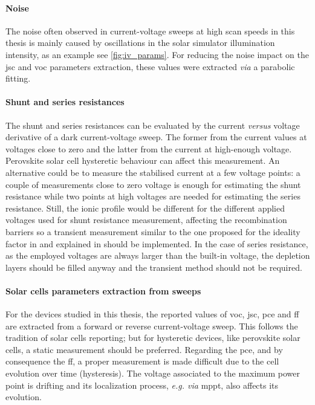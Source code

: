 	\paragraph{Noise}
	The noise often observed in current-voltage sweeps at high scan speeds in this thesis is mainly caused by oscillations in the solar simulator illumination intensity, as an example see \cref{fig:iv_params}.
	For reducing the noise impact on the \gls{jsc} and \gls{voc} parameters extraction, these values were extracted \textsl{via} a parabolic fitting.

	\paragraph{Shunt and series resistances} \label{resistances}
	The shunt and series resistances can be evaluated by the current \textsl{versus} voltage derivative of a dark current-voltage sweep.
	The former from the current values at voltages close to zero and the latter from the current at high-enough voltage.
	Perovskite solar cell hysteretic behaviour can affect this measurement.
	An alternative could be to measure the stabilised current at a few voltage points: a couple of measurements close to zero voltage is enough for estimating the shunt resistance while two points at high voltages are needed for estimating the series resistance.
	Still, the ionic profile would be different for the different applied voltages used for shunt resistance measurement, affecting the recombination barriers \cite{Moia2019,Pockett2017} so a transient measurement similar to the one proposed for the ideality factor in \cite{Calado2018b} and explained in  should be implemented.
	In the case of series resistance, as the employed voltages are always larger than the built-in voltage, the depletion layers should be filled anyway and the transient method should not be required.

	\paragraph{Solar cells parameters extraction from sweeps}\label{characterization_hysteresis}
	For the devices studied in this thesis, the reported values of \gls{voc}, \gls{jsc}, \gls{pce} and \gls{ff} are extracted from a forward or reverse current-voltage sweep.
	This follows the tradition of solar cells reporting; but for hysteretic devices, like perovskite solar cells, a static measurement should be preferred.
	Regarding the \gls{pce}, and by consequence the \gls{ff}, a proper measurement is made difficult due to the cell evolution over time (hysteresis).
	The voltage associated to the maximum power point is drifting and its localization process, \textsl{e.g. via} \gls{mppt}, also affects its evolution.

